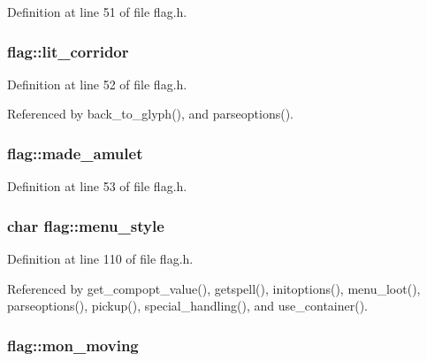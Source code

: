 Definition at line 51 of file flag.\+h.

\hypertarget{structflag_a59d21501a2f86108f46f1a523080eec2}{
\subsubsection[{lit\+\_\+corridor}]{ flag\+::lit\+\_\+corridor}}\label{structflag_a59d21501a2f86108f46f1a523080eec2}


Definition at line 52 of file flag.\+h.



Referenced by back\+\_\+to\+\_\+glyph(), and parseoptions().

\hypertarget{structflag_a41f2f729280257e4e4a770606bec1043}{
\subsubsection[{made\+\_\+amulet}]{ flag\+::made\+\_\+amulet}}\label{structflag_a41f2f729280257e4e4a770606bec1043}


Definition at line 53 of file flag.\+h.

\hypertarget{structflag_a4c7aac17ec6b0121796b28803d94547c}{
\subsubsection[{menu\+\_\+style}]{\setlength{\rightskip}{0pt plus 5cm}char flag\+::menu\+\_\+style}}\label{structflag_a4c7aac17ec6b0121796b28803d94547c}


Definition at line 110 of file flag.\+h.



Referenced by get\+\_\+compopt\+\_\+value(), getspell(), initoptions(), menu\+\_\+loot(), parseoptions(), pickup(), special\+\_\+handling(), and use\+\_\+container().

\hypertarget{structflag_aefca97315c578e47f6c6cdf06864db9e}{
\subsubsection[{mon\+\_\+moving}]{ flag\+::mon\+\_\+moving}}\label{structflag_aefca97315c578e47f6c6cdf06864db9e}


